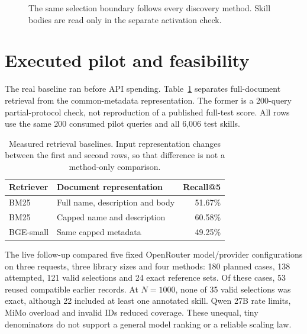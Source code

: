 \documentclass{article}
\begin{document}
\begin{figure}[t]
\centering
{}
\caption{The same selection boundary follows every discovery method. Skill bodies
are read only in the separate activation check.}
\label{fig:flow}
\end{figure}

\section{Executed pilot and feasibility}
The real baseline ran before API spending. Table~\ref{tab:retrieval} separates
full-document retrieval from the common-metadata representation. The former is
a 200-query partial-protocol check, not reproduction of a published full-test
score. All rows use the same 200 consumed pilot queries and all 6,006 test skills.

\begin{table}[h]
\centering
\begin{tabular}{llr}
\toprule
Retriever & Document representation & Recall@5 \\
\midrule
BM25 & Full name, description and body & 51.67\% \\
BM25 & Capped name and description & 60.58\% \\
BGE-small & Same capped metadata & 49.25\% \\
\bottomrule
\end{tabular}
\caption{Measured retrieval baselines. Input representation changes between the
first and second rows, so that difference is not a method-only comparison.}
\label{tab:retrieval}
\end{table}

The live follow-up compared five fixed OpenRouter model/provider configurations
on three requests, three library sizes and four methods: 180 planned cases,
138 attempted, 121 valid selections and 24 exact reference sets. Of these cases,
53 reused compatible earlier records. At $N=1000$, none of 35 valid selections
was exact, although 22 included at least one annotated skill. Qwen 27B rate limits,
MiMo overload and invalid IDs reduced coverage. These unequal, tiny denominators
do not support a general model ranking or a reliable scaling law.
\end{document}
